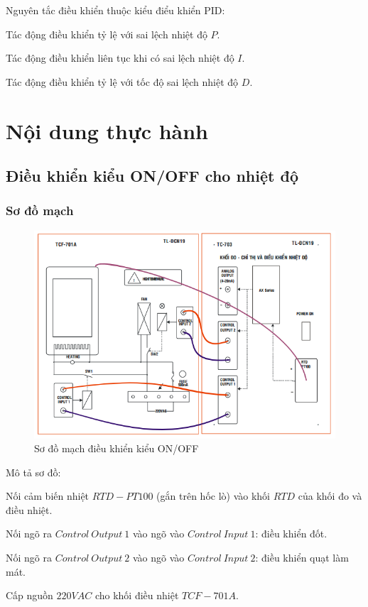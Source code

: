 \documentclass[13pt,a4paper]{extarticle}
\begin{document}
Nguyên tắc điều khiển thuộc kiểu điểu khiển PID:
\begin{list}{--}{}
\item Tác động điều khiển tỷ lệ với sai lệch nhiệt độ $P$.
\item Tác động điều khiển liên tục khi có sai lệch nhiệt độ $I$.
\item Tác động điều khiển tỷ lệ với tốc độ sai lệch nhiệt độ $D$.
\end{list}
\section{Nội dung thực hành}
\subsection{Điều khiển kiểu ON/OFF cho nhiệt độ}
\subsubsection{Sơ đồ mạch}
\begin{figure}[!h]
\begin{center}
\includegraphics[scale=.6]{2}
\end{center}
\caption{Sơ đồ mạch điều khiển kiểu ON/OFF}
\label{Fig:mach-on-off}
\end{figure}
Mô tả sơ đồ:
\begin{list}{--}{}
\item Nối cảm biến nhiệt $RTD-PT100$ (gắn trên hốc lò) vào khối $RTD$ của khối đo và điều nhiệt.
\item Nối ngõ ra $Control~Output~1$ vào ngõ vào $Control~Input~1$: điều khiển đốt.
\item Nối ngõ ra $Control~Output~2$ vào ngõ vào $Control~Input~2$: điều khiển quạt làm mát.
\item Cấp nguồn $220VAC$ cho khối điều nhiệt $TCF-701A$.
\end{list}
\end{document}

